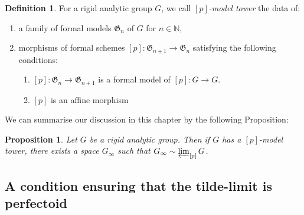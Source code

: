 \documentclass[11pt,oneside]{amsart}
\newtheorem{proposition}[theorem]{Proposition}
\theoremstyle{definition}
\newtheorem{definition}[theorem]{Definition}
\theoremstyle{remark}
\begin{document}
	\begin{definition}
		For a rigid analytic group $G$, we call \textit{$[p]$-model tower} the data of:
		\begin{enumerate}
			\item a family of formal models $\mathfrak G_n$ of $G$ for $n\in \mathbb N$,
			\item morphisms of formal schemes $[p]:\mathfrak G_{n+1}\rightarrow \mathfrak G_{n}$ satisfying the following conditions:
			\begin{enumerate}
				\item $[p]:\mathfrak G_n\rightarrow \mathfrak G_{n+1}$ is a formal model of $[p]:G\rightarrow G$. 
				\item $[p]$ is an affine morphism
			\end{enumerate}
		\end{enumerate}
	\end{definition}
	We can summarise our discussion in this chapter by the following Proposition:
	\begin{proposition}
		Let $G$ be a rigid analytic group. Then if $G$ has a $[p]$-model tower, there exists a space $G_\infty$ such that $G_\infty \sim \varprojlim_{[p]}G$.
	\end{proposition}
	
	\subsection{A condition ensuring that the tilde-limit is perfectoid}
	
\end{document}
